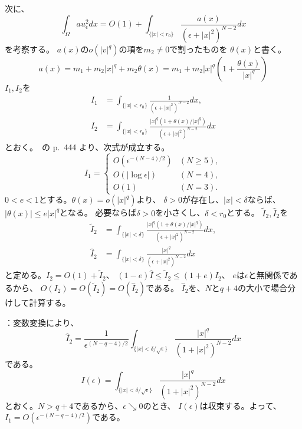 次に、
\[
 \int_\Omega au_\epsilon^2 dx = O(1) + \int_{ \{ \lvert x \rvert <
 r_0 \} } \frac{a(x)}{(\epsilon +
 \lvert x \rvert^2)^{N-2}} dx 
\]
を考察する。
$a(x)$の$o(\lvert v \rvert^q)$の項を$m_2 \neq 0$で割ったものを
$\theta(x)$と書く。
\[
 a(x) = m_1 + m_2 \lvert x \rvert^q + m_2 \theta(x) 
 = m_1 + m_2 \lvert x \rvert^q \left( 1 + \frac{\theta(x)}{\lvert
 x \rvert^q } \right)
\]
$I_1, I_2$を
\begin{align*}
 I_1 &= 
 \int_{ \{ \lvert x \rvert <
 r_0 \} } \frac{1}{(\epsilon +
 \lvert x \rvert^2)^{N-2}} dx, \\
 I_2 &= 
 \int_{ \{ \lvert x \rvert <
 r_0 \} } \frac{ \lvert x \rvert^q \left( 1 + \theta(x) / \lvert x
 \rvert^q \right)}{(\epsilon +
 \lvert x \rvert^2)^{N-2}} dx
\end{align*}
とおく。\cite{MR709644}~の p.~444 より、次式が成立する。
\[
 I_1 = \begin{cases}
        O(\epsilon^{-(N-4)/2}) & (N \geq 5),\\
        O(\lvert \log \epsilon \rvert) & (N = 4), \\ 
        O(1) & (N = 3).
       \end{cases}
\]
$0 < e < 1$とする。$\theta (x) = o(\lvert x \rvert^q)$より、
$\delta > 0$が存在し、$\lvert x \rvert < \delta$ならば、
$\lvert \theta (x) \rvert \leq e \lvert x \rvert^q$となる。
必要ならば$\delta > 0$を小さくし、$\delta < r_0$とする。
$\tilde{I}_2, \hat{I}_2$を
\begin{align*}
 \tilde{I}_2 &= 
 \int_{ \{ \lvert x \rvert <
 \delta \} } \frac{ \lvert x \rvert^q \left( 1 + \theta(x) / \lvert x
 \rvert^q \right)}{(\epsilon +
 \lvert x \rvert^2)^{N-2}} dx, \\ 
 \hat{I}_2 &= 
 \int_{ \{ \lvert x \rvert <
 \delta \} } \frac{ \lvert x \rvert^q }{(\epsilon +
 \lvert x \rvert^2)^{N-2}} dx
\end{align*}
と定める。$I_2 = O(1) + \tilde{I}_2$、
$(1 - e)\hat{I} \leq \tilde{I}_2 \leq (1 + e)\hat{I}_2$、
$e$は$\epsilon$と無関係であるから、
$O(I_2) = O(\tilde{I}_2) = O(\hat{I}_2)$である。
$\hat{I}_2$を、$N$と$q + 4$の大小で場合分けして計算する。

：変数変換により、
\[
 \hat{I}_2 = \frac{1}{\epsilon^{(N-q - 4)/2}} \int_{ \{ \lvert x
 \rvert < \delta / \sqrt{\epsilon}\}} 
 \frac{ \lvert x \rvert^{q}}{(1 +
 \lvert x \rvert^2)^{N-2}} dx
\]
である。
\[
 I(\epsilon) = \int_{ \{ \lvert x
 \rvert < \delta / \sqrt{\epsilon}\}} 
 \frac{ \lvert x \rvert^{q}}{(1 +
 \lvert x \rvert^2)^{N-2}} dx
\]
とおく。$N > q + 4$であるから、$\epsilon \searrow 0$のとき、
$I(\epsilon)$は収束する。よって、$I_1 =
O(\epsilon^{-(N-q-4)/2})$である。


